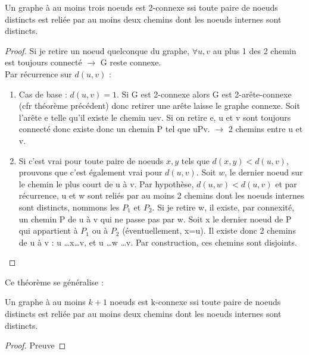 \begin{mytheo} 
  Un graphe à au moins trois noeuds est 2-connexe ssi toute paire de noeuds distincts est reliée par au moins deux chemins dont les noeuds internes sont distincts.
  \begin{proof}
  \newline
   \fbox{$\Longleftarrow$}
   \newline
   Si je retire un noeud quelconque du graphe, $\forall u,v$ au plus 1 des 2 chemin est toujours connecté $\rightarrow$ G reste connexe. \\
   \fbox{$\Longrightarrow$}
     \newline
     Par récurrence sur $d(u,v)$ : 
     \begin{enumerate}
     \item Cas de base : $d(u,v)=1$. Si G est 2-connexe alors G est 2-arête-connexe (cfr théorème précédent) donc retirer une arête laisse le graphe connexe. Soit l'arête e telle qu'il existe le chemin uev. Si on retire e, u et v sont toujours connecté donc existe donc un chemin P tel que uPv. $\rightarrow$ 2 chemins entre u et v.
     \item Si c'est vrai pour toute paire de noeuds $x,y$ tels que $d(x,y) < d(u,v)$, prouvons que c'est également vrai pour $d(u,v)$. Soit $w$, le dernier noeud sur le chemin le plus court de u à v. Par hypothèse, $d(u,w) < d(u,v)$ et par récurrence, u et w sont reliés par au moins 2 chemins dont les noeuds internes sont distincts, nommons les $P_1$ et $P_2$. Si je retire w, il existe, par connexité, un chemin P de u à v qui ne passe pas par w. Soit x le dernier noeud de P qui appartient à $P_1$ ou à $P_2$ (éventuellement, x=u). Il existe donc 2 chemins de u à v : u \dots x\dots v, et u \dots w \dots v. Par construction, ces chemins sont disjoints. 
     \end{enumerate}
  \end{proof}
\end{mytheo}

Ce théorème se généralise :

\begin{mytheo} 
  Un graphe à au moins $k + 1$ noeuds est k-connexe ssi toute paire de noeuds distincts est reliée par au moins deux chemins dont les noeuds internes sont distincts.
  \begin{proof}
     Preuve \addTODO
  \end{proof}
\end{mytheo}

